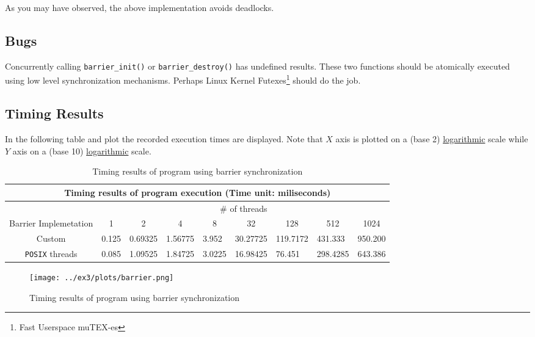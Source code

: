 \documentclass{article}
\def\code#1{\texttt{#1}}
\begin{document}
\hspace{-0.6cm} As you may have observed, the above implementation avoids deadlocks.

\subsection{Bugs}
Concurrently calling \code{barrier\_init()} or \code{barrier\_destroy()} has undefined results.
These two functions should be atomically executed using low level synchronization mechanisms.
Perhaps Linux Kernel Futexes\footnote{Fast Userspace muTEX-es} should do the job.

\newpage 

\subsection{Timing Results}
In the following table and plot the recorded execution times are displayed.
Note that $X$ axis is plotted on a (base 2) \underline{logarithmic} scale while
$Y$ axis on a (base 10) \underline{logarithmic} scale.


\begin{table}[htbp]
  \centering
    \begin{tabular}{|c||l|l|l|l|l|l|l|l|} 
    \hline
    \multicolumn{9}{|c|}{Timing results of program execution (Time unit: miliseconds)} \\
    \hline
    & \multicolumn{8}{|c|}{\# of threads} \\
    \hline
    Barrier Implemetation  & \multicolumn{1}{|c|}{1} & \multicolumn{1}{|c|}{2} & \multicolumn{1}{|c|}{4} &
    \multicolumn{1}{|c|}{8} & \multicolumn{1}{|c|}{32} & \multicolumn{1}{|c|}{128} & \multicolumn{1}{|c|}{512} & 
    \multicolumn{1}{|c|}{1024}\\
    \hline\hline
    Custom & 0.125 & 0.69325 & 1.56775 & 3.952 & 30.27725 & 119.7172 & 431.333 & 950.200 \\
    \hline
    \texttt{POSIX} threads & 0.085 & 1.09525 & 1.84725 & 3.0225 & 16.98425 & 76.451 & 298.4285 & 643.386 \\
    \hline
    \end{tabular}
  \caption{Timing results of program using barrier synchronization}
\end{table}


\begin{figure}[htbp]
  \centering
  \texttt{[image: ../ex3/plots/barrier.png]}
  \caption{Timing results of program using barrier synchronization}
\end{figure}
\end{document}
